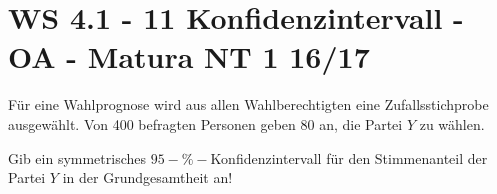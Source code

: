 \section{WS 4.1 - 11 Konfidenzintervall - OA - Matura NT 1 16/17}

\begin{beispiel}[WS 4.1]{1} %
Für eine Wahlprognose wird aus allen Wahlberechtigten eine Zufallsstichprobe ausgewählt. Von 400 befragten Personen geben 80 an, die Partei $Y$ zu wählen.

Gib ein symmetrisches $95-\%-$Konfidenzintervall für den Stimmenanteil der Partei $Y$ in der Grundgesamtheit an!

\end{beispiel}